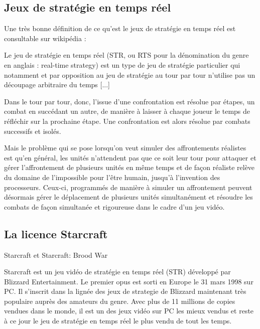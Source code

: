 \subsection{Jeux de stratégie en temps réel}%
\label{sub:jeux_de_strategie_en_temps_reel}

Une très bonne définition de ce qu'est le jeux de stratégie en
temps réel est consultable sur wikipédia :

  Le jeu de stratégie en temps réel (STR, ou RTS pour la
  dénomination du genre en anglais : real-time strategy) est un type de
  jeu de stratégie particulier qui notamment et par opposition au jeu de
  stratégie au tour par tour n’utilise pas un découpage arbitraire du
  temps [...]

  Dans le tour par tour, donc, l’issue d’une confrontation est résolue par
  étapes, un combat en succédant un autre, de manière à laisser à chaque
  joueur le temps de réfléchir sur la prochaine étape. Une confrontation
  est alors résolue par combats successifs et isolés.

  Mais le problème qui se pose lorsqu’on veut simuler des affrontements
  réalistes est qu’en général, les unités n’attendent pas que ce soit leur
  tour pour attaquer et gérer l’affrontement de plusieurs unités en même
  temps et de façon réaliste relève du domaine de l’impossible pour l’être
  humain, jusqu’à l’invention des processeurs. Ceux-ci, programmés de
  manière à simuler un affrontement peuvent désormais gérer le déplacement
  de plusieurs unités simultanément et résoudre les combats de façon
  simultanée et rigoureuse dans le cadre d’un jeu vidéo.

\subsection{La licence Starcraft}%
\label{sub:la_licence_starcraft}

Starcraft et Starcraft: Brood War

  Starcraft est un jeu vidéo de stratégie en temps réel (STR) développé
  par Blizzard Entertainment. Le premier opus est sorti en Europe le 31
  mars 1998 sur PC. Il s'inscrit dans la lignée des jeux de strategie de
  Blizzard maintenant très populaire auprès des amateurs du genre. Avec
  plus de 11 millions de copies vendues dans le monde, il est un des
  jeux vidéo sur PC les mieux vendus et reste à ce jour le jeu de
  stratégie en temps réel le plus vendu de tout les temps.

